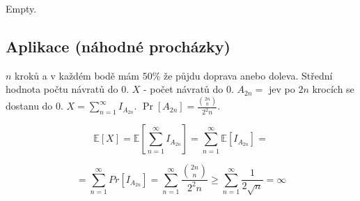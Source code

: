 \begin{dukaz}
	Empty.
\end{dukaz}

\subsection{Aplikace (náhodné procházky)}

$n$ kroků a v každém bodě mám $50\%$ že půjdu doprava anebo doleva. Střední hodnota počtu návratů do $0$. $X$ - počet návratů do $0$. $A_{2n}=$ jev po $2n$ krocích se dostanu do $0$. $X = \sum_{n=1}^{\infty} I_{A_{2n}}$. $\Pr[A_{2n}]=\frac{\binom{2n}{n}}{2^2n}$.

$$
\mathbb{E}[X] = \mathbb{E}[\sum_{n=1}^{\infty}I_{A_{2n}}] = \sum_{n=1}^{\infty} \mathbb{E} [I_{A_{2n}}] = 
$$

$$
= \sum_{n=1}^{\infty} Pr [I_{A_{2n}}] = \sum_{n=1}^{\infty} \frac{\binom{2n}{n}}{2^2n} \geq \sum_{n=1}^{\infty} \frac{1}{2\sqrt{n}} = \infty
$$